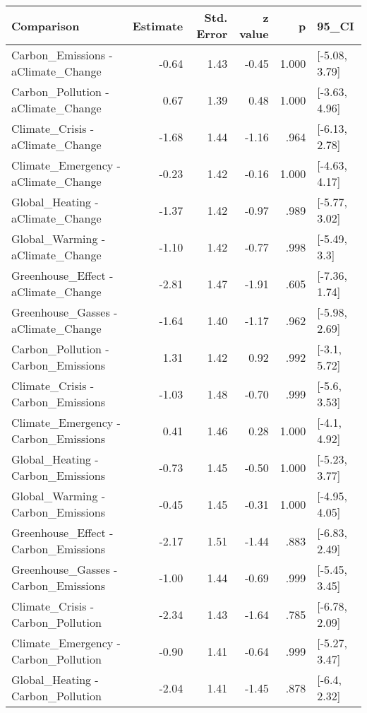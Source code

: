 \begin{table}[ht]
\centering
\begin{tabular}{lrrrrl}
  \hline
Comparison & Estimate & Std. Error & z value & p & 95_CI \\ 
  \hline
Carbon\_Emissions - aClimate\_Change & -0.64 & 1.43 & -0.45 & 1.000 & [-5.08, 3.79] \\ 
  Carbon\_Pollution - aClimate\_Change & 0.67 & 1.39 & 0.48 & 1.000 & [-3.63, 4.96] \\ 
  Climate\_Crisis - aClimate\_Change & -1.68 & 1.44 & -1.16 & .964 & [-6.13, 2.78] \\ 
  Climate\_Emergency - aClimate\_Change & -0.23 & 1.42 & -0.16 & 1.000 & [-4.63, 4.17] \\ 
  Global\_Heating - aClimate\_Change & -1.37 & 1.42 & -0.97 & .989 & [-5.77, 3.02] \\ 
  Global\_Warming - aClimate\_Change & -1.10 & 1.42 & -0.77 & .998 & [-5.49, 3.3] \\ 
  Greenhouse\_Effect - aClimate\_Change & -2.81 & 1.47 & -1.91 & .605 & [-7.36, 1.74] \\ 
  Greenhouse\_Gasses - aClimate\_Change & -1.64 & 1.40 & -1.17 & .962 & [-5.98, 2.69] \\ 
  Carbon\_Pollution - Carbon\_Emissions & 1.31 & 1.42 & 0.92 & .992 & [-3.1, 5.72] \\ 
  Climate\_Crisis - Carbon\_Emissions & -1.03 & 1.48 & -0.70 & .999 & [-5.6, 3.53] \\ 
  Climate\_Emergency - Carbon\_Emissions & 0.41 & 1.46 & 0.28 & 1.000 & [-4.1, 4.92] \\ 
  Global\_Heating - Carbon\_Emissions & -0.73 & 1.45 & -0.50 & 1.000 & [-5.23, 3.77] \\ 
  Global\_Warming - Carbon\_Emissions & -0.45 & 1.45 & -0.31 & 1.000 & [-4.95, 4.05] \\ 
  Greenhouse\_Effect - Carbon\_Emissions & -2.17 & 1.51 & -1.44 & .883 & [-6.83, 2.49] \\ 
  Greenhouse\_Gasses - Carbon\_Emissions & -1.00 & 1.44 & -0.69 & .999 & [-5.45, 3.45] \\ 
  Climate\_Crisis - Carbon\_Pollution & -2.34 & 1.43 & -1.64 & .785 & [-6.78, 2.09] \\ 
  Climate\_Emergency - Carbon\_Pollution & -0.90 & 1.41 & -0.64 & .999 & [-5.27, 3.47] \\ 
  Global\_Heating - Carbon\_Pollution & -2.04 & 1.41 & -1.45 & .878 & [-6.4, 2.32] \\ 

\end{tabular}
\end{table}
